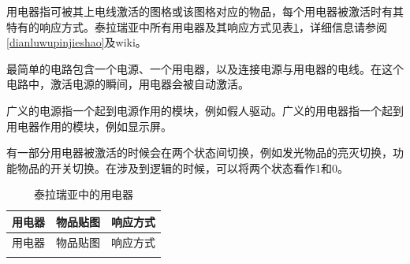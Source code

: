 用电器指可被其上电线激活的图格或该图格对应的物品，每个用电器被激活时有其特有的响应方式。泰拉瑞亚中所有用电器及其响应方式见表\ref{yongdianqi}，详细信息请参阅\autoref{dianluwupinjieshao}及wiki。

最简单的电路包含一个电源、一个用电器，以及连接电源与用电器的电线。在这个电路中，激活电源的瞬间，用电器会被自动激活。

广义的电源指一个起到电源作用的模块，例如假人驱动。广义的用电器指一个起到用电器作用的模块，例如显示屏。

有一部分用电器被激活的时候会在两个状态间切换，例如发光物品的亮灭切换，功能物品的开关切换。在涉及到逻辑的时候，可以将两个状态看作1和0。

\begin{longtable}{c|c|c}
	\caption{泰拉瑞亚中的用电器}\label{yongdianqi}\\
	用电器		&	物品贴图	&	响应方式	\\
	\hline \hline
	\endfirsthead
用电器		&	物品贴图	&	响应方式	\\
\hline \hline
\endhead
\hline
\endfoot



\end{longtable}
